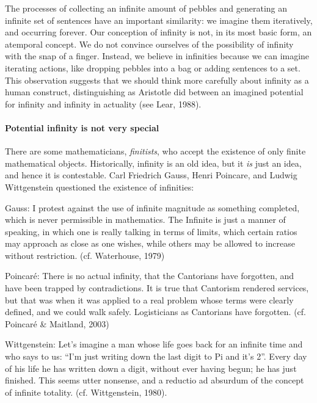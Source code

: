   The processes of collecting an infinite amount of pebbles and generating an infinite set of sentences have an important similarity: we imagine them iteratively, and occurring forever. Our conception of infinity is not, in its most basic form, an atemporal concept. We do not convince ourselves of the possibility of infinity with the snap of a finger. Instead, we believe in infinities because we can imagine iterating actions, like dropping pebbles into a bag or adding sentences to a set. This observation suggests that we should think more carefully about infinity as a human construct, distinguishing as Aristotle did between an imagined potential for infinity and infinity in actuality (see Lear, 1988).

\paragraph{Potential infinity is not very special}

There are some mathematicians, \textit{finitists}, who accept the existence of only finite mathematical objects. Historically, infinity is an old idea, but it \textit{is} just an idea, and hence it is contestable. Carl Friedrich Gauss, Henri Poincare, and Ludwig Wittgenstein questioned the existence of infinities: 

Gauss: I protest against the use of infinite magnitude as something completed, which is never permissible in mathematics. The Infinite is just a manner of speaking, in which one is really talking in terms of limits, which certain ratios may approach as close as one wishes, while others may be allowed to increase without restriction. (cf. Waterhouse, 1979)

Poincaré: There is no actual infinity, that the Cantorians have forgotten, and have been trapped by contradictions. It is true that Cantorism rendered services, but that was when it was applied to a real problem whose terms were clearly defined, and we could walk safely. Logisticians as Cantorians have forgotten. (cf. Poincaré \& Maitland, 2003) 

Wittgenstein: Let's imagine a man whose life goes back for an infinite time and who says to us: “I'm just writing down the last digit to Pi and it's 2”. Every day of his life he has written down a digit, without ever having begun; he has just finished. This seems utter nonsense, and a reductio ad absurdum of the concept of infinite totality. (cf. Wittgenstein, 1980).

